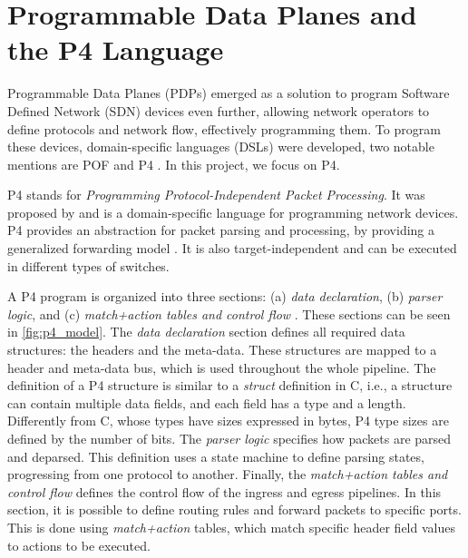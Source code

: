 \section{Programmable Data Planes and the P4 Language}
\label{sec:bg:pdp}


Programmable Data Planes (PDPs) emerged as a solution to program Software Defined Network (SDN) devices even further, allowing network operators to define protocols and network flow, effectively programming them. To program these devices, domain-specific languages (DSLs) were developed, two notable mentions are POF \cite{Song2013} and P4 \cite{Bosshart2014}. In this project, we focus on P4.


\label{sec:bg:p4}

P4 stands for \textit{Programming Protocol-Independent Packet Processing}. It was proposed by  and is a domain-specific language for programming network devices. P4 provides an abstraction for packet parsing and processing, by providing a generalized forwarding model \cite{Cordeiro2017}. It is also target-independent and can be executed in different types of switches.

A P4 program is organized into three sections: (a) \textit{data declaration}, (b) \textit{parser logic}, and (c) \textit{match+action tables and control flow} \cite{Cordeiro2017}. These sections can be seen in \autoref{fig:p4_model}. The \textit{data declaration} section defines all required data structures: the headers and the meta-data. These structures are mapped to a header and meta-data bus, which is used throughout the whole pipeline. The definition of a P4 structure is similar to a \textit{struct} definition in C, i.e., a structure can contain multiple data fields, and each field has a type and a length. Differently from C, whose types have sizes expressed in bytes, P4 type sizes are defined by the number of bits. The \textit{parser logic} specifies how packets are parsed and deparsed. This definition uses a state machine to define parsing states, progressing from one protocol to another. Finally, the \textit{match+action tables and control flow} defines the control flow of the ingress and egress pipelines. In this section, it is possible to define routing rules and forward packets to specific ports. This is done using \textit{match+action} tables, which match specific header field values to actions to be executed.

